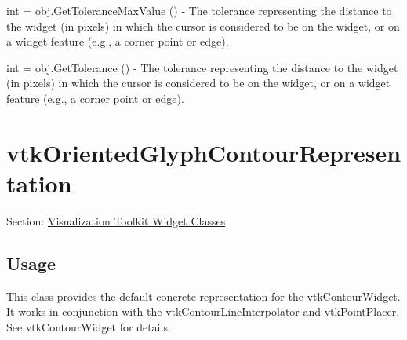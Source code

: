 \begin{DoxyItemize}
\item {\ttfamily int = obj.\-Get\-Tolerance\-Max\-Value ()} -\/ The tolerance representing the distance to the widget (in pixels) in which the cursor is considered to be on the widget, or on a widget feature (e.\-g., a corner point or edge).  
\item {\ttfamily int = obj.\-Get\-Tolerance ()} -\/ The tolerance representing the distance to the widget (in pixels) in which the cursor is considered to be on the widget, or on a widget feature (e.\-g., a corner point or edge).  
\end{DoxyItemize}\hypertarget{vtkwidgets_vtkorientedglyphcontourrepresentation}{}\section{vtk\-Oriented\-Glyph\-Contour\-Representation}\label{vtkwidgets_vtkorientedglyphcontourrepresentation}
Section\-: \hyperlink{sec_vtkwidgets}{Visualization Toolkit Widget Classes} \hypertarget{vtkwidgets_vtkxyplotwidget_Usage}{}\subsection{Usage}\label{vtkwidgets_vtkxyplotwidget_Usage}
This class provides the default concrete representation for the vtk\-Contour\-Widget. It works in conjunction with the vtk\-Contour\-Line\-Interpolator and vtk\-Point\-Placer. See vtk\-Contour\-Widget for details.

